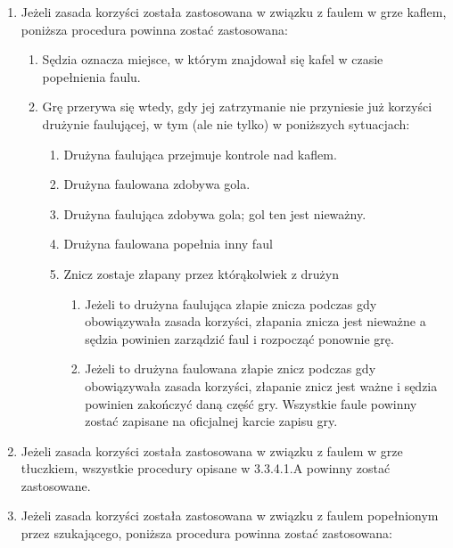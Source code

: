 \documentclass[12pt]{article}
\begin{document}
\begin{enumerate}
	\item
	      Jeżeli zasada korzyści została zastosowana w związku z faulem w grze
	      kaflem, poniższa procedura powinna zostać zastosowana:

	      \begin{enumerate}
		      \item
		            Sędzia oznacza miejsce, w którym znajdował się kafel w czasie
		            popełnienia faulu.
		      \item
		            Grę przerywa się wtedy, gdy jej zatrzymanie nie przyniesie już
		            korzyści drużynie faulującej, w tym (ale nie tylko) w poniższych
		            sytuacjach:

		            \begin{enumerate}
			            \item
			                  Drużyna faulująca przejmuje kontrole nad kaflem.
			            \item
			                  Drużyna faulowana zdobywa gola.
			            \item
			                  Drużyna faulująca zdobywa gola; gol ten jest nieważny.
			            \item
			                  Drużyna faulowana popełnia inny faul
			            \item
			                  Znicz zostaje złapany przez którąkolwiek z drużyn

			                  \begin{enumerate}
				                  \item
				                        Jeżeli to drużyna faulująca złapie znicza podczas gdy
				                        obowiązywała zasada korzyści, złapania znicza jest nieważne a
				                        sędzia powinien zarządzić faul i rozpocząć ponownie grę.
				                  \item
				                        Jeżeli to drużyna faulowana złapie znicz podczas gdy
				                        obowiązywała zasada korzyści, złapanie znicz jest ważne i sędzia
				                        powinien zakończyć daną część gry. Wszystkie faule powinny
				                        zostać zapisane na oficjalnej karcie zapisu gry.
			                  \end{enumerate}
		            \end{enumerate}
	      \end{enumerate}
	\item
	      Jeżeli zasada korzyści została zastosowana w związku z faulem w grze
	      tłuczkiem, wszystkie procedury opisane w 3.3.4.1.A powinny zostać
	      zastosowane.
	\item
	      Jeżeli zasada korzyści została zastosowana w związku z faulem
	      popełnionym przez szukającego, poniższa procedura powinna zostać
	      zastosowana:


\end{enumerate}
\end{document}
